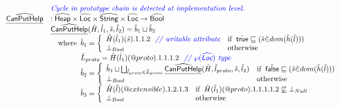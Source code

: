 \[\begin{array}{ll}
& {\color{blue} \textit{Cycle in prototype chain is detected at implementation level.}} \\
\widehat{\underline{\sf CanPutHelp}} &  : \widehat{\mbox{\textsf{Heap}}} \times \widehat{\mbox{\textsf{Loc}}} \times \widehat{\mbox{\textsf{String}}} \times \widehat{\mbox{\textsf{Loc}}} \rightarrow \widehat{\mbox{\textsf{Bool}}}\\
&  \widehat{\underline{\sf CanPutHelp}}(\hat{H},\hat{l}_1,\hat{s},\hat{l}_2)  = \hat{b}_1\sqcup\hat{b}_2\\
&  \quad{\rm where}\begin{array}[t]{l}
    \hat{b}_1 =
    \left\{
      \begin{array}{ll}
        \hat{H}(\hat{l}_1)(\hat{s}).1.1.2
        ~~{\color{blue} \textit{// writable attribute}}
        & {\rm if}\begin{array}[t]{l}\hat{\mbox{\textsf{true}}}\sqsubseteq(\hat{s} \dot{\in} dom(\hat{h}(\hat{l})))\end{array}\\
        \bot_{Bool} & {\rm otherwise}\\
      \end{array}
    \right.\\
    \hat{L}_{proto}=\hat{H}(\hat{l}_1)(@proto).1.1.1.2
~~{\color{blue} \textit{// $\wp(\widehat{\mbox{\textsf{Loc}}})$ type}}\\
    \hat{b}_2 =
    \left\{
      \begin{array}{ll}
        \hat{b}_3 \sqcup \bigsqcup_{\hat{l}_{proto}\in\hat{L}_{proto}}\widehat{\underline{\sf CanPutHelp}}(\hat{H},\hat{l}_{proto},\hat{s},\hat{l}_2)& {\rm if}\begin{array}[t]{l}\hat{\mbox{\textsf{false}}}\sqsubseteq(\hat{s} \dot{\in} dom(\hat{h}(\hat{l})))\end{array}\\
        \bot_{Bool} & {\rm otherwise}\\
      \end{array}
    \right.\\
    \hat{b}_3 =
    \left\{
      \begin{array}{ll}
        \hat{H}(\hat{l})(@extensible).1.2.1.3& {\rm if}\begin{array}[t]{l}\hat{H}(\hat{l}_1)(@proto).1.1.1.1.2 \not\sqsubseteq \bot_{Null}\end{array}\\
        \bot_{Bool} & {\rm otherwise}\\
      \end{array}
    \right.\\
    \end{array}\\
\\


\end{array}\]

